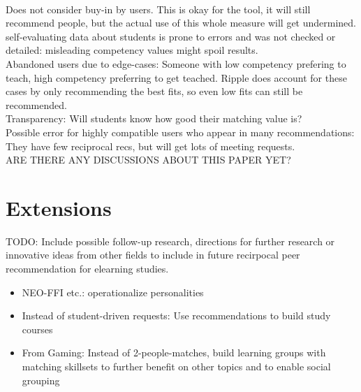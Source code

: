 \documentclass[nochapterpage,bigchapter,linedtoc,longdoc,colorback,accentcolor=tud3b]{tudreport}
\begin{document}
\\
Does not consider buy-in by users. This is okay for the tool, it will still recommend people, but the actual use of this whole measure will get undermined.\\
self-evaluating data about students is prone to errors and was not checked or detailed: misleading competency values might spoil results.\\
Abandoned users due to edge-cases: Someone with low competency prefering to teach, high competency preferring to get teached. Ripple does account for these cases by only recommending the best fits, so even low fits can still be recommended.\\
Transparency: Will students know how good their matching value is?\\
Possible error for highly compatible users who appear in many recommendations: They have few reciprocal recs, but will get lots of meeting requests.\\
ARE THERE ANY DISCUSSIONS ABOUT THIS PAPER YET?\\


\chapter{Extensions}
TODO: Include possible follow-up research, directions for further research or innovative ideas from other fields to include in future recirpocal peer recommendation for elearning studies.\\
\begin{itemize}
	\item NEO-FFI etc.: operationalize personalities
	\item Instead of student-driven requests: Use recommendations to build study courses
	\item From Gaming: Instead of 2-people-matches, build learning groups with matching skillsets to further benefit on other topics and to enable social grouping\\
\end{itemize}




\end{document}
